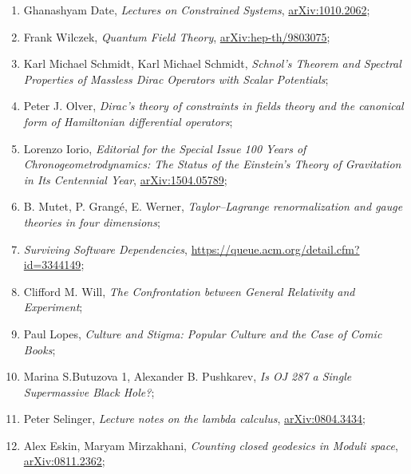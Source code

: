 \documentclass[a4paper,11pt]{article}
\begin{document}
\begin{enumerate}
\item Ghanashyam Date, \textit{Lectures on Constrained Systems},
  \href{https://arxiv.org/abs/1010.2062v1}{arXiv:1010.2062};

\item Frank Wilczek, \textit{Quantum Field Theory},
  \href{https://arxiv.org/abs/hep-th/9803075v2}{arXiv:hep-th/9803075};

\item Karl Michael Schmidt, Karl Michael Schmidt, \textit{Schnol’s
    Theorem and Spectral Properties of Massless Dirac Operators with
    Scalar Potentials};

\item Peter J. Olver, \textit{Dirac’s theory of constraints in fields
    theory and the canonical form of Hamiltonian differential
    operators};


\item Lorenzo Iorio, \textit{Editorial for the Special Issue 100 Years
    of Chronogeometrodynamics: The Status of the Einstein's Theory of
    Gravitation in Its Centennial Year},
  \href{https://arxiv.org/abs/1504.05789v2}{arXiv:1504.05789};

\item B. Mutet, P. Grang\'{e}, E. Werner, \textit{Taylor–Lagrange
    renormalization and gauge theories in four dimensions};


\item \textit{Surviving Software Dependencies},
  \href{https://queue.acm.org/detail.cfm?id=3344149}{https://queue.acm.org/detail.cfm?id=3344149};

\item Clifford M. Will, \textit{The Confrontation between General
    Relativity and Experiment};

\item Paul Lopes, \textit{Culture and Stigma: Popular Culture and the
    Case of Comic Books};

\item Marina S.Butuzova 1, Alexander B. Pushkarev, \textit{Is OJ 287 a
    Single Supermassive Black Hole?};

\item Peter Selinger, \textit{Lecture notes on the lambda calculus},
  \href{https://arxiv.org/abs/0804.3434v2}{arXiv:0804.3434};

\item Alex Eskin, Maryam Mirzakhani, \textit{Counting closed geodesics
    in Moduli space},
  \href{https://arxiv.org/abs/0811.2362v3}{arXiv:0811.2362};


\end{enumerate}
\end{document}
